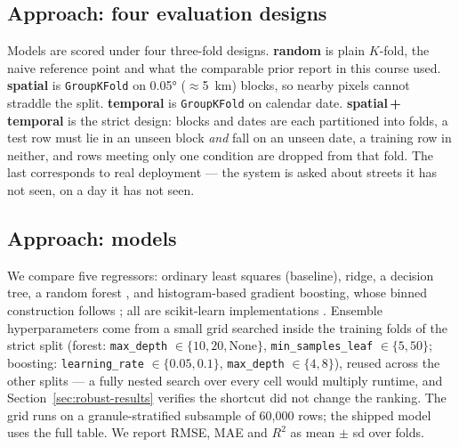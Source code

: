 \documentclass[10pt]{article}   %
\begin{document}
\subsection{Approach: four evaluation designs}
\label{sec:splits}
Models are scored under four three-fold designs. \textbf{random} is plain $K$-fold, the naive
reference point and what the comparable prior report in this course used.
\textbf{spatial} is \texttt{GroupKFold} on \ang{0.05} ($\approx$\SI{5}{\kilo\metre}) blocks,
so nearby pixels cannot straddle the split. \textbf{temporal} is \texttt{GroupKFold} on
calendar date. \textbf{spatial\,+\,temporal} is the strict design: blocks and dates are each
partitioned into folds, a test row must lie in an unseen block \emph{and} fall on an unseen
date, a training row in neither, and rows meeting only one condition are dropped from that
fold. The last corresponds to real deployment --- the system is asked about streets it has
not seen, on a day it has not seen.

\subsection{Approach: models}
We compare five regressors: ordinary least squares (baseline), ridge, a decision tree, a
random forest \citep{breiman2001randomforests}, and histogram-based gradient boosting, whose
binned construction follows \citet{ke2017lightgbm}; all are scikit-learn implementations
\citep{pedregosa2011scikitlearn}. Ensemble hyperparameters come from a small grid searched
inside the training folds of the strict split (forest: \texttt{max\_depth}
$\in \{10, 20, \text{None}\}$, \texttt{min\_samples\_leaf} $\in \{5, 50\}$; boosting:
\texttt{learning\_rate} $\in \{0.05, 0.1\}$, \texttt{max\_depth} $\in \{4, 8\}$), reused
across the other splits --- a fully nested search over every cell would multiply runtime, and
Section~\ref{sec:robust-results} verifies the shortcut did not change the ranking. The grid
runs on a granule-stratified subsample of 60{,}000 rows; the shipped model uses the full
table. We report RMSE, MAE and $R^2$ as mean $\pm$ sd over folds.
\end{document}

